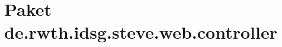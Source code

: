 \hypertarget{namespacede_1_1rwth_1_1idsg_1_1steve_1_1web_1_1controller}{\section{Paket de.\+rwth.\+idsg.\+steve.\+web.\+controller}
\label{namespacede_1_1rwth_1_1idsg_1_1steve_1_1web_1_1controller}
}
